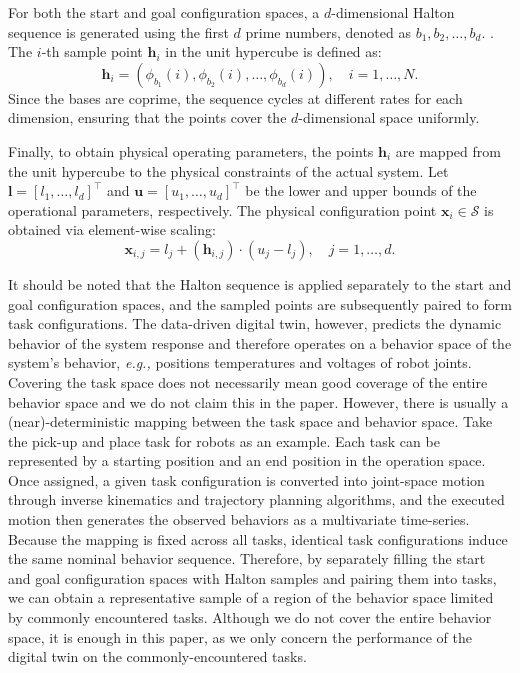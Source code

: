 \documentclass[a4paper,10pt]{cas-sc}%
\newcommand{\rev}[1]{\textcolor{revisionred}{#1}}
\begin{document}
For both the start and goal configuration spaces, a $d$-dimensional Halton sequence is generated using the first $d$ prime numbers, denoted as
$b_1,b_2,\ldots,b_d$. \citep{chi2005optimal}. The $i$-th sample point $\mathbf{h}_i$ in the unit hypercube is defined as:
\begin{equation}
	\mathbf{h}_i = \left( \phi_{b_1}(i), \phi_{b_2}(i), \dots, \phi_{b_d}(i) \right), \quad i = 1, \dots, N.
\end{equation}
Since the bases are coprime, the sequence cycles at different rates for each dimension, ensuring that the points cover the $d$-dimensional space uniformly.

Finally, to obtain physical operating parameters, the points $\mathbf{h}_i$ are mapped from the unit hypercube to the physical constraints of the actual system. Let $\mathbf{l} = [l_1, \dots, l_d]^\top$ and $\mathbf{u} = [u_1, \dots, u_d]^\top$ be the lower and upper bounds of the operational parameters, respectively. The physical configuration point $\mathbf{x}_i \in \mathcal{S}$ is obtained via element-wise scaling:
\begin{equation}
	\mathbf{x}_{i,j} = l_j + (\mathbf{h}_{i,j}) \cdot (u_j - l_j), \quad j = 1, \dots, d.
\end{equation}

\rev{It should be noted that the Halton sequence is applied separately to the start and goal configuration spaces, and the sampled points are subsequently paired to form task configurations. The data-driven digital twin, however, predicts the dynamic behavior of the system response and therefore operates on a behavior space of the system's behavior, \emph{e.g.,} positions temperatures and voltages of robot joints. Covering the task space does not necessarily mean good coverage of the entire behavior space and we do not claim this in the paper. However, there is usually a (near)-deterministic mapping between the task space and behavior space. Take the pick-up and place task for robots as an example. Each task can be represented by a starting position and an end position in the operation space. Once assigned, a given task configuration is converted into joint-space motion through inverse kinematics and trajectory planning algorithms, and the executed motion then generates the observed behaviors as a multivariate time-series. Because the mapping is fixed across all tasks, identical task configurations induce the same nominal behavior sequence. Therefore, by separately filling the start and goal configuration spaces with Halton samples and pairing them into tasks, we can obtain a representative sample of a region of the behavior space limited by commonly encountered tasks. Although we do not cover the entire behavior space, it is enough in this paper, as we only concern the performance of the digital twin on the commonly-encountered tasks.}
\end{document}
